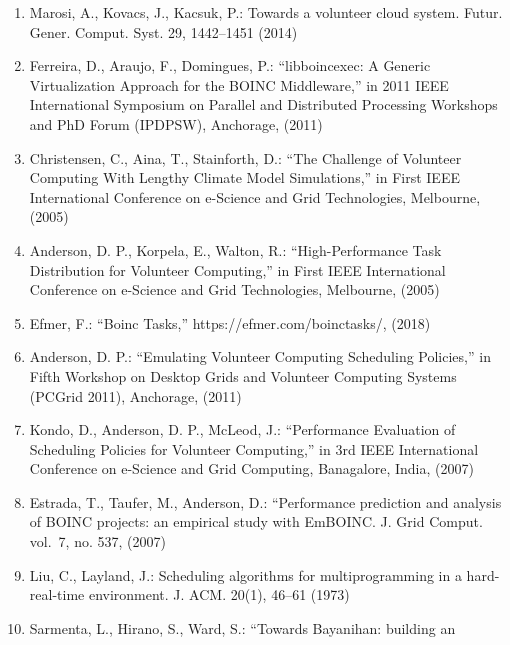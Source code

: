 \documentclass[
]{article}
\begin{document}
\begin{enumerate}
  Latinoamericana de Computación de Alto Rendimiento, Mérida, Venezuela,
  2009\\
\item
  Marosi, A., Kovacs, J., Kacsuk, P.: Towards a volunteer cloud system.
  Futur. Gener. Comput. Syst. 29, 1442--1451 (2014)\\
\item
  Ferreira, D., Araujo, F., Domingues, P.: ``libboincexec: A Generic
  Virtualization Approach for the BOINC Middleware,'' in 2011 IEEE
  International Symposium on Parallel and Distributed Processing
  Workshops and PhD Forum (IPDPSW), Anchorage, (2011)\\
\item
  Christensen, C., Aina, T., Stainforth, D.: ``The Challenge of
  Volunteer Computing With Lengthy Climate Model Simulations,'' in First
  IEEE International Conference on e-Science and Grid Technologies,
  Melbourne, (2005)\\
\item
  Anderson, D. P., Korpela, E., Walton, R.: ``High-Performance Task
  Distribution for Volunteer Computing,'' in First IEEE International
  Conference on e-Science and Grid Technologies, Melbourne, (2005)\\
\item
  Efmer, F.: ``Boinc Tasks,'' https://efmer.com/boinctasks/, (2018)\\
\item
  Anderson, D. P.: ``Emulating Volunteer Computing Scheduling
  Policies,'' in Fifth Workshop on Desktop Grids and Volunteer Computing
  Systems (PCGrid 2011), Anchorage, (2011)\\
\item
  Kondo, D., Anderson, D. P., McLeod, J.: ``Performance Evaluation of
  Scheduling Policies for Volunteer Computing,'' in 3rd IEEE
  International Conference on e-Science and Grid Computing, Banagalore,
  India, (2007)\\
\item
  Estrada, T., Taufer, M., Anderson, D.: ``Performance prediction and
  analysis of BOINC projects: an empirical study with EmBOINC. J. Grid
  Comput. vol.~7, no. 537, (2007)\\
\item
  Liu, C., Layland, J.: Scheduling algorithms for multiprogramming in a
  hard-real-time environment. J. ACM. 20(1), 46--61 (1973)\\
\item
  Sarmenta, L., Hirano, S., Ward, S.: ``Towards Bayanihan: building an

\end{enumerate}
\end{document}

